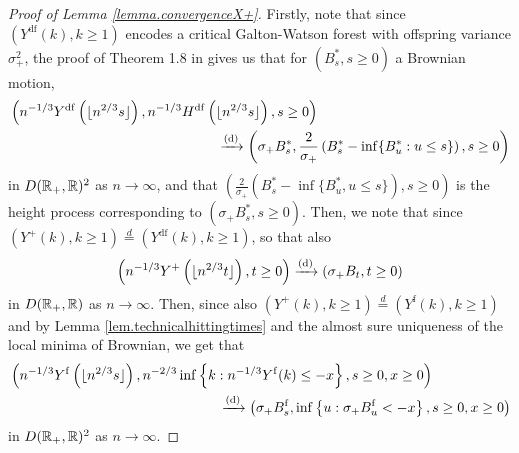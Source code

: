 \begin{proof}[Proof of Lemma \ref{lemma.convergenceX+}]
Firstly, note that since $(Y^{\mathrm{df}}(k),k\geq 1)$ encodes a critical Galton-Watson forest with offspring variance $\sigma_+^2$, the proof of Theorem 1.8 in \citet{legallRandomTreesApplications2005} gives us that for $(B^*_s,s\geq 0)$ a Brownian motion,
\begin{align}\label{eq.convergenceX}
&\left(n^{-1/3}Y^{\mathrm{df}}\left(\lfloor n^{2/3}s\rfloor \right), n^{-1/3}H^{\mathrm{df}}\left(\lfloor n^{2/3}s\rfloor \right), s\geq 0 \right) \nonumber \\
& \hspace{15em} \todist \left(\sigma_+ B^*_s,\frac{2}{\sigma_+} \left(B^*_s-\inf\{B^*_u:u\leq s\}\right),  s\geq 0\right)
\end{align} 
 in $D({\mathbb R}_+,{\mathbb R})^2$ as $n\to \infty$, and that $\left(\frac{2}{\sigma_+}(B^*_s-\inf\{B^*_u,u\leq s\}),s\geq 0\right)$ is the height process corresponding to $\left(\sigma_+ B^*_s,s \geq 0\right)$. Then, we note that since $(Y^+(k),k\geq 1)\overset{d}{=}(Y^{\mathrm{df}}(k),k\geq 1)$, so that also
 $$\left(n^{-1/3}Y^+\left(\lfloor n^{2/3} t\rfloor \right),t\geq 0\right)\xrightarrow[]{\mathrm{(d)}}\left(\sigma_+ B_t, t\geq 0\right)$$
in $D({\mathbb R}_+,{\mathbb R})$ as $n\to \infty$. Then, since also $(Y^+(k),k\geq 1)\overset{d}{=}(Y^{\mathrm{f}}(k),k\geq 1)$ and by Lemma \ref{lem.technicalhittingtimes} and the almost sure uniqueness of the local minima of Brownian, we get that
\begin{align}\begin{split}\label{eq.convergencebychaumont}&\left(n^{-1/3}Y^{\mathrm{f}}\left(\lfloor n^{2/3} s \rfloor \right), n^{-2/3}\inf\left\{k:n^{-1/3}Y^{\mathrm{f}}(k) \leq -x\right\}, s \geq 0, x\geq 0 \right)\\
&\hspace{15em}\todist\left( \sigma_+ B^{\mathrm{f}}_s, \inf\left\{u:\sigma_+ B^{\mathrm{f}}_u < -x\right\}, s\geq 0, x \geq 0\right)\end{split}\end{align}
in $D({\mathbb R}_+,{\mathbb R})^2$ as $n\to \infty$.
 

\end{proof}
